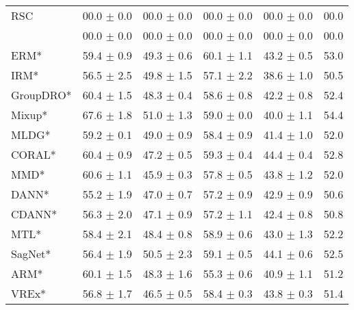 \begin{table*}
\begin{center}
\begin{tabular}{lccccc}
RSC                  & 00.0 $\pm$ 0.0       & 00.0 $\pm$ 0.0        & 00.0 $\pm$ 0.0       & 00.0 $\pm$ 0.0        & 00.0                 \\
\divcams 	   & 00.0 $\pm$ 0.0       & 00.0 $\pm$ 0.0        & 00.0 $\pm$ 0.0       & 00.0 $\pm$ 0.0        & 00.0                 \\
\midrule
ERM*                  & 59.4 $\pm$ 0.9       & 49.3 $\pm$ 0.6       & 60.1 $\pm$ 1.1       & 43.2 $\pm$ 0.5       & 53.0                 \\
IRM*                  & 56.5 $\pm$ 2.5       & 49.8 $\pm$ 1.5       & 57.1 $\pm$ 2.2       & 38.6 $\pm$ 1.0       & 50.5                 \\
GroupDRO*             & 60.4 $\pm$ 1.5       & 48.3 $\pm$ 0.4       & 58.6 $\pm$ 0.8       & 42.2 $\pm$ 0.8       & 52.4                 \\
Mixup*                & 67.6 $\pm$ 1.8       & 51.0 $\pm$ 1.3       & 59.0 $\pm$ 0.0       & 40.0 $\pm$ 1.1       & 54.4                 \\
MLDG*                 & 59.2 $\pm$ 0.1       & 49.0 $\pm$ 0.9       & 58.4 $\pm$ 0.9       & 41.4 $\pm$ 1.0       & 52.0                 \\
CORAL*                & 60.4 $\pm$ 0.9       & 47.2 $\pm$ 0.5       & 59.3 $\pm$ 0.4       & 44.4 $\pm$ 0.4       & 52.8                 \\
MMD*                  & 60.6 $\pm$ 1.1       & 45.9 $\pm$ 0.3       & 57.8 $\pm$ 0.5       & 43.8 $\pm$ 1.2       & 52.0                 \\
DANN*                 & 55.2 $\pm$ 1.9       & 47.0 $\pm$ 0.7       & 57.2 $\pm$ 0.9       & 42.9 $\pm$ 0.9       & 50.6                 \\
CDANN*                & 56.3 $\pm$ 2.0       & 47.1 $\pm$ 0.9       & 57.2 $\pm$ 1.1       & 42.4 $\pm$ 0.8       & 50.8                 \\
MTL*                  & 58.4 $\pm$ 2.1       & 48.4 $\pm$ 0.8       & 58.9 $\pm$ 0.6       & 43.0 $\pm$ 1.3       & 52.2                 \\
SagNet*               & 56.4 $\pm$ 1.9       & 50.5 $\pm$ 2.3       & 59.1 $\pm$ 0.5       & 44.1 $\pm$ 0.6       & 52.5                 \\
ARM*                  & 60.1 $\pm$ 1.5       & 48.3 $\pm$ 1.6       & 55.3 $\pm$ 0.6       & 40.9 $\pm$ 1.1       & 51.2                 \\
VREx*                 & 56.8 $\pm$ 1.7       & 46.5 $\pm$ 0.5       & 58.4 $\pm$ 0.3       & 43.8 $\pm$ 0.3       & 51.4                 \\

\end{tabular}
\end{center}
\end{table*}
